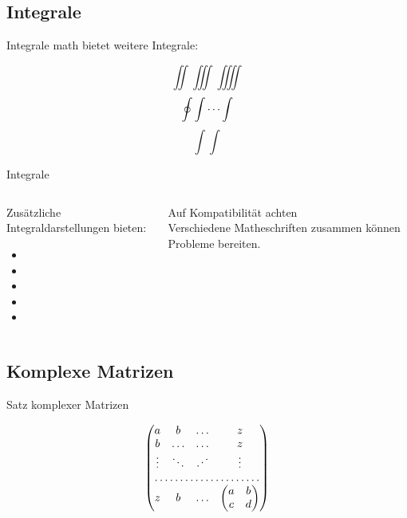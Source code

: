 \documentclass[
	vorläufig=false,
	datum=2018-11-12,
	titel={Mathematiksatz II},
	web=true,
	max,
	aspectratio=1610,
]{../tex/latexkurs-slides}
\begin{document}
\subsection{Integrale}
\begin{frame}[fragile]{Integrale}
\AmS{}math bietet weitere Integrale:
\begin{LTXexample}[width=.45\textwidth]
\[ \iint \iiint \iiiint \]
\[ \oint \idotsint \]
\[ \int \int \]
\end{LTXexample}
\end{frame}

\begin{frame}[fragile]{Integrale}
\begin{columns}
\begin{column}{.4\textwidth}
Zusätzliche Integraldarstellungen bieten:
\begin{itemize}
\item {}
\item {}
\item {}
\item {}
\item {}
\end{itemize}
\end{column}
\begin{column}{.5\textwidth}
\alert{Auf Kompatibilität achten}\\
Verschiedene Matheschriften zusammen können Probleme bereiten.
\end{column}
\end{columns}
\end{frame}


\subsection{Komplexe Matrizen}
\begin{frame}[fragile]{Satz komplexer Matrizen}
\begin{LTXexample}[width=.4\textwidth]
\[
\begin{pmatrix}
  a & b     & \dots & z\\
  b & \dots & \dots & z\\
  \vdots & \ddots& \reflectbox{\(\ddots\)} 
                              & \vdots\\
  \hdotsfor{4}\\
  z & b & \dots &
      \begin{pmatrix}
        a & b \\ c & d
      \end{pmatrix}
\end{pmatrix}
\]

\end{LTXexample}
\end{frame}
\end{document}
